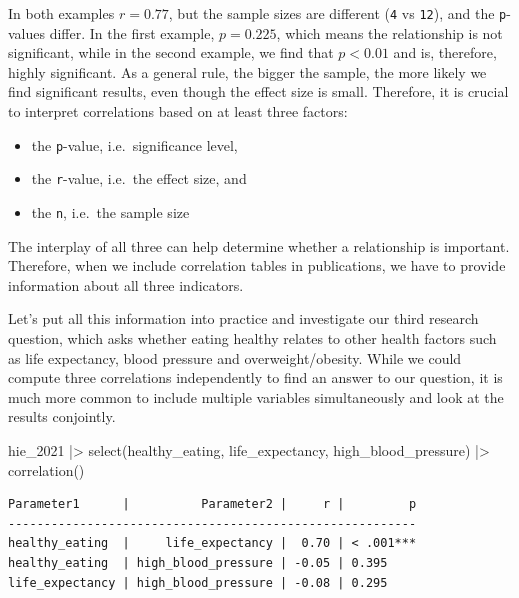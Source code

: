 \documentclass[
  letterpaper,
  DIV=11,
  numbers=noendperiod]{scrreprt}
\newenvironment{Shaded}{\begin{snugshade}}{\end{snugshade}}
\newcommand{\FunctionTok}[1]{\textcolor[rgb]{0.28,0.35,0.67}{#1}}
\newcommand{\NormalTok}[1]{\textcolor[rgb]{0.00,0.23,0.31}{#1}}
\newcommand{\SpecialCharTok}[1]{\textcolor[rgb]{0.37,0.37,0.37}{#1}}
\begin{document}
In both examples \(r = 0.77\), but the sample sizes are different
(\texttt{4} vs \texttt{12}), and the \texttt{p}-values differ. In the
first example, \(p = 0.225\), which means the relationship is not
significant, while in the second example, we find that \(p < 0.01\) and
is, therefore, highly significant. As a general rule, the bigger the
sample, the more likely we find significant results, even though the
effect size is small. Therefore, it is crucial to interpret correlations
based on at least three factors:

\begin{itemize}
\item
  the \texttt{p}-value, i.e.~significance level,
\item
  the \texttt{r}-value, i.e.~the effect size, and
\item
  the \texttt{n}, i.e.~the sample size
\end{itemize}

The interplay of all three can help determine whether a relationship is
important. Therefore, when we include correlation tables in
publications, we have to provide information about all three indicators.

Let's put all this information into practice and investigate our third
research question, which asks whether eating healthy relates to other
health factors such as life expectancy, blood pressure and
overweight/obesity. While we could compute three correlations
independently to find an answer to our question, it is much more common
to include multiple variables simultaneously and look at the results
conjointly.

\begin{Shaded}
\begin{Highlighting}[]
\NormalTok{hie\_2021 }\SpecialCharTok{|\textgreater{}}
  \FunctionTok{select}\NormalTok{(healthy\_eating, life\_expectancy, high\_blood\_pressure) }\SpecialCharTok{|\textgreater{}}
  \FunctionTok{correlation}\NormalTok{()}
\end{Highlighting}
\end{Shaded}

\begin{verbatim}
Parameter1      |          Parameter2 |     r |         p
---------------------------------------------------------
healthy_eating  |     life_expectancy |  0.70 | < .001***
healthy_eating  | high_blood_pressure | -0.05 | 0.395    
life_expectancy | high_blood_pressure | -0.08 | 0.295    
\end{verbatim}
\end{document}
